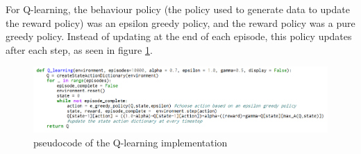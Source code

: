 For Q-learning, the behaviour policy (the policy used to generate data to update the reward policy) was an epsilon greedy policy, and the reward policy was a pure greedy policy. Instead of updating at the end of each episode, this policy updates after each step, as seen in figure \ref{fig:Qpseudo}.
\begin{figure}[h]
\includegraphics[width=\textwidth]{images/Qpseudo}
\caption[Q-learning implementation pseudocode]{pseudocode of the Q-learning implementation}
\label{fig:Qpseudo}
\end{figure}


